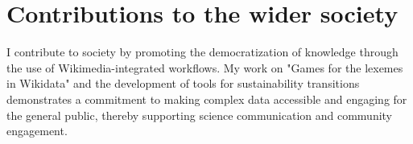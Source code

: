 \documentclass[12pt]{article}
\begin{document}
\section*{Contributions to the wider society}
I contribute to society by promoting the democratization of knowledge through the use of Wikimedia-integrated workflows. My work on "Games for the lexemes in Wikidata" and the development of tools for sustainability transitions demonstrates a commitment to making complex data accessible and engaging for the general public, thereby supporting science communication and community engagement.
\end{document}
